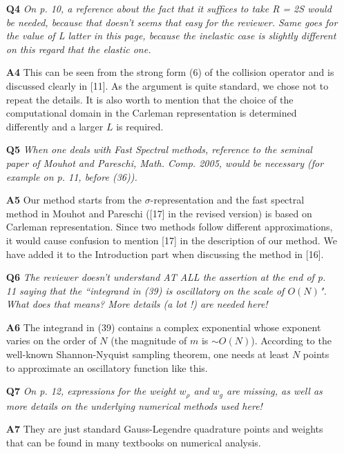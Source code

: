\documentclass[11pt]{article}
\begin{document}
\begin{itemize}
\item[{\bf Q4}] {\it On p. 10, a reference about the fact that it suffices to take R = 2S would be needed, because that doesn't seems that easy for the reviewer. Same goes for the value of L latter in this page, because the inelastic case is slightly different on this regard that the elastic one.}

\item[{\bf A4}] This can be seen from the strong form (6) of the collision operator and is discussed clearly in [11]. As the argument is quite standard, we chose not to repeat the details. It is also worth to mention that the choice of the computational domain in the Carleman representation is determined differently and a larger $L$ is required.

\item[{\bf Q5}] {\it When one deals with Fast Spectral methods, reference to the seminal paper of Mouhot and Pareschi, Math. Comp. 2005, would be necessary (for example on p. 11, before (36)).}

\item[{\bf A5}] Our method starts from the $\sigma$-representation and the fast spectral method in Mouhot and Pareschi ([17] in the revised version) is based on Carleman representation. Since two methods follow different approximations, it would cause confusion to mention [17] in the description of our method. We have added it to the Introduction part when discussing the method in [16].


\item[{\bf Q6}] {\it The reviewer doesn't understand AT ALL the assertion at the end of p. 11 saying that the ``integrand in (39) is oscillatory on the scale of $O(N)$". What does that means? More details (a lot !) are needed here!}

\item[{\bf A6}] The integrand in (39) contains a complex exponential whose exponent varies on the order of $N$ (the magnitude of $m$ is $\sim O(N)$). According to the well-known Shannon-Nyquist sampling theorem, one needs at least $N$ points to approximate an oscillatory function like this.

\item[{\bf Q7}] {\it On p. 12, expressions for the weight $w_{\rho}$ and $w_g$ are missing, as well as more details on the underlying numerical methods used here!}

\item[{\bf A7}] They are just standard Gauss-Legendre quadrature points and weights that can be found in many textbooks on numerical analysis.


\end{itemize}
\end{document}
